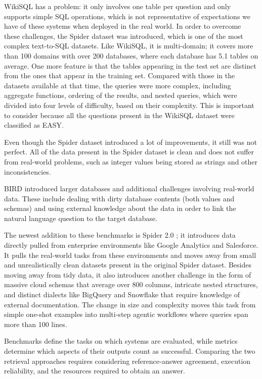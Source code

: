 WikiSQL has a problem: it only involves one table per question and only supports simple SQL operations, which
is not representative of expectations we have of these systems when deployed in the real world. In order to
overcome these challenges, the Spider \cite{yu2018spider} dataset was introduced, which is one of the most
complex text-to-SQL datasets. Like WikiSQL, it is multi-domain; it covers more than \num{100} domains with
over \num{200} databases, where each database has \num{5.1} tables on average. One more feature is that the
tables appearing in the test set are distinct from the ones that appear in the training set. Compared with
those in the datasets available at that time, the queries were more complex, including aggregate functions,
ordering of the results, and nested queries, which were divided into four levels of difficulty, based on
their complexity. This is important to consider because all the questions present in the WikiSQL dataset were
classified as EASY.

Even though the Spider dataset introduced a lot of improvements, it still was not perfect. All of the data
present in the Spider dataset is clean and does not suffer from real-world problems, such as integer values
being stored as strings and other inconsistencies.

BIRD \cite{li2023can} introduced larger databases and additional challenges involving real-world data. These
include dealing with dirty database contents (both values and schemas) and using external knowledge about the
data in order to link the natural language question to the target database.

The newest addition to these benchmarks is Spider 2.0 \cite{lei2025spider}; it introduces data directly
pulled from enterprise environments like Google Analytics and Salesforce. It pulls the real-world tasks from
these environments and moves away from small and unrealistically clean datasets present in the original
Spider dataset. Besides moving away from tidy data, it also introduces another challenge in the form of
massive cloud schemas that average over \num{800} columns, intricate nested structures, and distinct dialects
like BigQuery and Snowflake that require knowledge of external documentation. The change in size and
complexity moves this task from simple one-shot examples into multi-step agentic workflows where queries
span more than \num{100} lines.

Benchmarks define the tasks on which systems are evaluated, while metrics determine which aspects of their
outputs count as successful. Comparing the two retrieval approaches requires considering reference-answer
agreement, execution reliability, and the resources required to obtain an answer.

